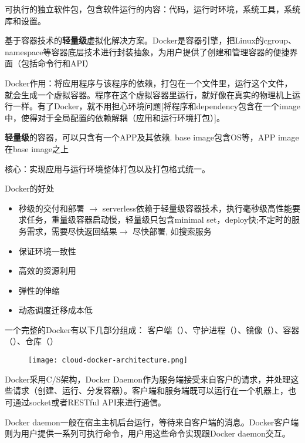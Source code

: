 \begin{definition}[镜像]
    可执行的独立软件包，包含软件运行的内容：代码，运行时环境，系统工具，系统库和设置。
\end{definition}

\begin{definition}[Docker]
    基于容器技术的\textbf{轻量级}虚拟化解决方案。Docker是容器引擎，把Linux的cgroup、namespace等容器底层技术进行封装抽象，为用户提供了创建和管理容器的便捷界面（包括命令行和API）

\end{definition}

Docker作用：将应用程序与该程序的依赖，打包在一个文件里，运行这个文件，就会生成一个虚拟容器。程序在这个虚拟容器里运行，就好像在真实的物理机上运行一样。有了Docker，就不用担心环境问题[将程序和dependency包含在一个image中，使得对于全局配置的依赖解耦（应用和运行环境打包）]。

\textbf{轻量级}的容器，可以只含有一个APP及其依赖. base image包含OS等，APP image在base image之上

核心：实现应用与运行环境整体打包以及打包格式统一。

Docker的好处

\begin{itemize}
    \item 秒级的交付和部署 $\rightarrow$ serverless依赖于轻量级容器技术，执行毫秒级高性能要求任务，重量级容器启动慢，轻量级只包含minimal set，deploy快;不定时的服务需求，需要尽快返回结果$\rightarrow$ 尽快部署, 如搜索服务
    \item 保证环境一致性
    \item 高效的资源利用
    \item 弹性的伸缩
    \item 动态调度迁移成本低
\end{itemize}

一个完整的Docker有以下几部分组成：
客户端（）、守护进程（）、镜像（）、容器（）、仓库（）

\begin{figure}[htbp]
    \centering
    \texttt{[image: cloud-docker-architecture.png]}
\end{figure}

Docker采用C/S架构，Docker Daemon作为服务端接受来自客户的请求，并处理这些请求（创建、运行、分发容器）。客户端和服务端既可以运行在一个机器上，也可通过socket或者RESTful API来进行通信。

Docker daemon一般在宿主主机后台运行，等待来自客户端的消息。Docker客户端则为用户提供一系列可执行命令，用户用这些命令实现跟Docker daemon交互。

